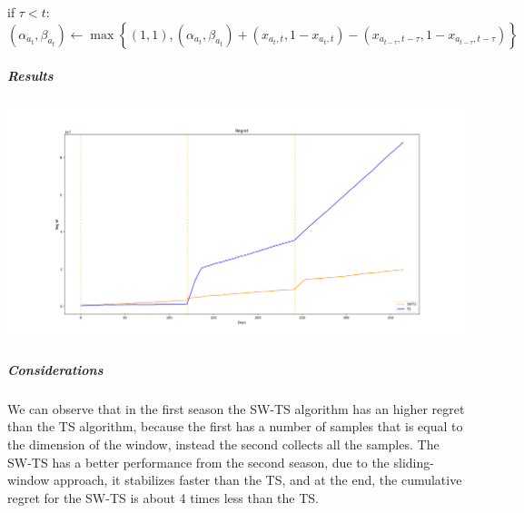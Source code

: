 if $\tau<t$:	$(\alpha_{a_{t}}, \beta_{a_{t}}) \leftarrow \max \left\{(1,1), (\alpha_{a_{t}}, \beta_{a_{t}}) + (x_{a_{t},t}, 1 - x_{a_{t},t}) - (x_{a_{t-\tau},t-\tau}, 1 - x_{a_{t-\tau},t-\tau})    \right\}$
\subparagraph*{Results}
\begin{center}
	\includegraphics[scale=0.30]{Images/n7}
\end{center}
\subparagraph*{Considerations}
We can observe that in the first season the SW-TS algorithm has an higher regret than the TS algorithm, because the first has a number of samples that is equal to the dimension of the window, instead the second collects all the samples. The SW-TS has a better performance from the second season, due to the sliding-window approach, it stabilizes faster than the TS, and at the end, the cumulative regret for the SW-TS is about 4 times less than the TS.